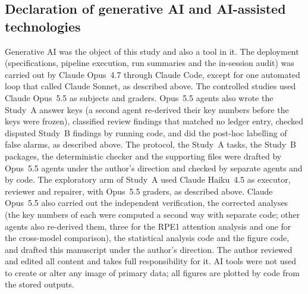 \subsection*{Declaration of generative AI and AI-assisted technologies}
Generative AI was the object of this study and also a tool in it. The
deployment (specifications, pipeline execution, run summaries and the
in-session audit) was carried out by Claude Opus~4.7 through Claude Code,
except for one automated loop that called Claude Sonnet, as described
above. The controlled studies used Claude Opus~5.5 as subjects
and graders. Opus~5.5 agents also wrote the Study~A answer keys (a
second agent re-derived their key numbers before the keys were frozen),
classified review findings that matched no ledger entry, checked disputed
Study~B findings by running code, and did the post-hoc labelling of false
alarms, as described above. The protocol, the Study~A tasks, the Study~B
packages, the deterministic checker and the supporting files were drafted
by Opus~5.5 agents under the author's direction and checked by separate
agents and by code. The exploratory arm of Study~A used Claude Haiku~4.5 as
executor, reviewer and repairer, with Opus~5.5 graders, as described
above. Claude Opus~5.5 also carried out the independent verification, the
corrected analyses (the key numbers of each were computed a second way
with separate code; other agents also re-derived them, three for the RPE1
attention analysis and one for the cross-model comparison), the statistical
analysis code and the figure code, and
drafted this manuscript under the author's direction. The author reviewed
and edited all content and takes full responsibility for it. AI tools were
not used to create or alter any image of primary data; all figures are
plotted by code from the stored outputs.

